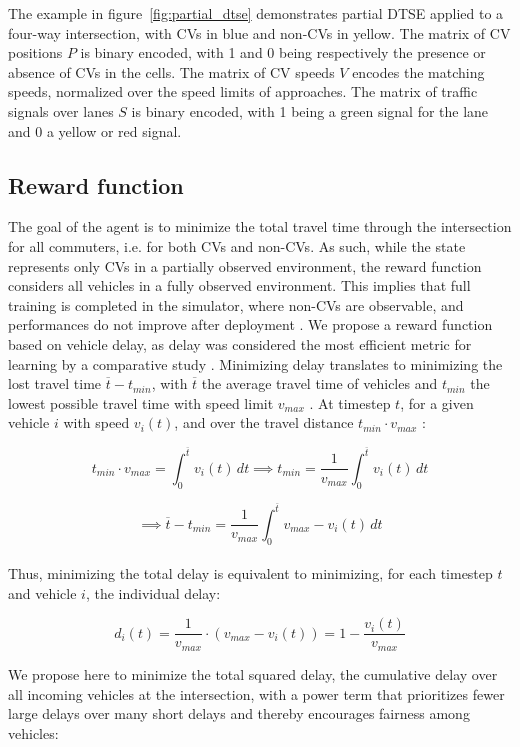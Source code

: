 \documentclass[journal]{IEEEtran}
\begin{document}
The example in figure~\ref{fig:partial_dtse} demonstrates partial DTSE applied to a four-way intersection, with CVs in blue and non-CVs in yellow. The matrix of CV positions $P$ is binary encoded, with 1 and 0 being respectively the presence or absence of CVs in the cells. The matrix of CV speeds $V$ encodes the matching speeds, normalized over the speed limits of approaches. The matrix of traffic signals over lanes $S$ is binary encoded, with 1 being a green signal for the lane and 0 a yellow or red signal.

\subsection{Reward function}

The goal of the agent is to minimize the total travel time through the intersection for all commuters, i.e. for both CVs and non-CVs. As such, while the state represents only CVs in a partially observed environment, the reward function considers all vehicles in a fully observed environment. This implies that full training is completed in the simulator, where non-CVs are observable, and performances do not improve after deployment \cite{zhang2020using}. We propose a reward function based on vehicle delay, as delay was considered the most efficient metric for learning by a comparative study \cite{touhbi2017adaptative}. Minimizing delay translates to minimizing the lost travel time $\overline{t} - t_{min}$, with $\overline{t}$ the average travel time of vehicles and $t_{min}$ the lowest possible travel time with speed limit $v_{max}$ \cite{zhang2020using}. At timestep $t$, for a given vehicle $i$ with speed $v_i(t)$, and over the travel distance $t_{min} \cdot v_{max}$ :

\[ t_{min} \cdot v_{max} = \int_{0}^{\overline{t}} v_i(t) \,dt \implies t_{min} = \frac{1}{v_{max}} \int_{0}^{\overline{t}} v_i(t) \,dt \]

\[ \implies \overline{t} - t_{min} = \frac{1}{v_{max}} \int_{0}^{\overline{t}} v_{max} - v_i(t) \,dt \]
\\

Thus, minimizing the total delay is equivalent to minimizing, for each timestep $t$ and vehicle $i$, the individual delay:

\[ d_i(t) = \frac{1}{v_{max}} \cdot ({v_{max}} - v_i(t)) = 1 - \frac{v_i(t)}{v_{max}} \]

We propose here to minimize the total squared delay, the cumulative delay over all incoming vehicles at the intersection, with a power term that prioritizes fewer large delays over many short delays and thereby encourages fairness among vehicles:
\end{document}
